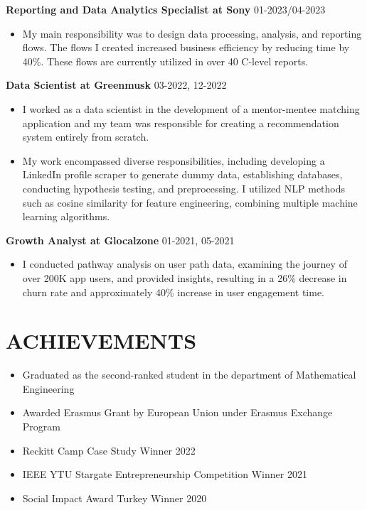 \documentclass[letterpaper,9pt]{extarticle} %
\begin{document}
\noindent
\textbf{Reporting and Data Analytics Specialist at Sony} \hfill 01-2023/04-2023 %
\begin{itemize}
    \item My main responsibility was to design data processing, analysis, and reporting flows. The flows I created increased business efficiency by reducing time by 40\%. These flows are currently utilized in over 40 C-level reports. 
\end{itemize}

\noindent
\textbf{Data Scientist at Greenmusk} \hfill 03-2022, 12-2022 %
\begin{itemize}
    \item I worked as a data scientist in the development of a mentor-mentee matching application and my team was responsible for creating a recommendation system entirely from scratch. %
    \item My work encompassed diverse responsibilities, including developing a LinkedIn profile scraper to generate dummy data, establishing databases, conducting hypothesis testing, and preprocessing. I utilized NLP methods such as cosine similarity for feature engineering, combining multiple machine learning algorithms.
\end{itemize}

\noindent
\textbf{Growth Analyst at Glocalzone} \hfill 01-2021, 05-2021 %
\begin{itemize}
    \item I conducted pathway analysis on user path data, examining the journey of over 200K app users, and provided insights, resulting in a 26\% decrease in churn rate and approximately 40\% increase in user engagement time.
\end{itemize}

\section*{ACHIEVEMENTS}
\begin{itemize}
    \item Graduated as the second-ranked student in the department of Mathematical Engineering
    \item Awarded Erasmus Grant by European Union under Erasmus Exchange Program
    \item Reckitt Camp Case Study Winner 2022
    \item IEEE YTU Stargate Entrepreneurship Competition Winner 2021
    \item Social Impact Award Turkey Winner 2020
\end{itemize}
\end{document}
